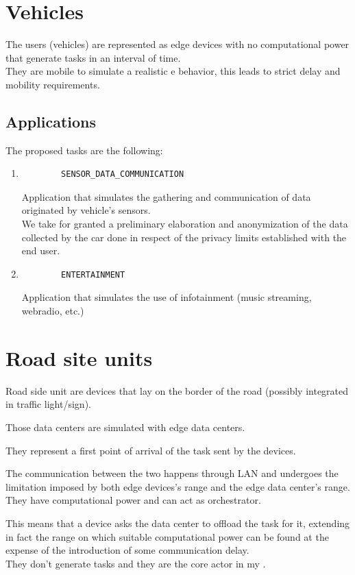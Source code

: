 \documentclass[12pt]{report}
\begin{document}
\section{Vehicles}
The users (vehicles) are represented as edge devices with no computational power that generate tasks in an interval of time.\\
They are mobile to simulate a realistic e behavior, this leads to strict delay and mobility requirements.

\subsection{Applications}
The proposed tasks are the following:
\begin{enumerate}
\item
	\begin{verbatim}
		SENSOR_DATA_COMMUNICATION
	\end{verbatim}
	Application that simulates the gathering and communication of data originated by vehicle's sensors.\\
	We take for granted a preliminary elaboration and anonymization of the data collected by the car done in respect of the privacy limits established with the end user.
	\item
	\begin{verbatim}
		ENTERTAINMENT
	\end{verbatim}
	Application that simulates the use of infotainment (music streaming, webradio, etc.)
\end{enumerate}

\section{Road site units}
Road side unit are devices that lay on the border of the road (possibly integrated in traffic light/sign).

Those data centers are simulated with edge data centers.

They represent a first point of arrival of the task sent by the devices.

The communication between the two happens through LAN and undergoes the limitation imposed by both edge devices's range and the edge data center's range.\\
They have computational power and can act as orchestrator.

This means that a device asks the data center to offload the task for it, extending in fact the range on which suitable computational power can be found at the expense of the introduction of some communication delay.\\
They don't generate tasks and they are the core actor in my .
\end{document}
